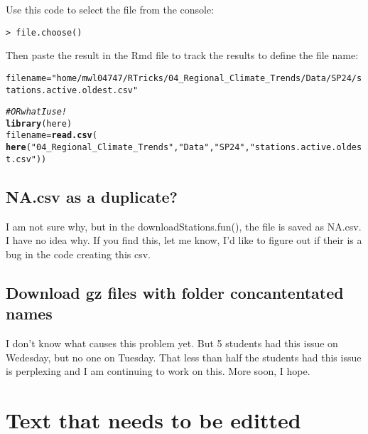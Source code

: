 \documentclass{article}\usepackage[]{graphicx}\usepackage[dvipsnames]{xcolor}
\makeatletter
\newcommand{\hlstr}[1]{\textcolor[rgb]{0.192,0.494,0.8}{#1}}%
\newcommand{\hlcom}[1]{\textcolor[rgb]{0.678,0.584,0.686}{\textit{#1}}}%
\newcommand{\hlstd}[1]{\textcolor[rgb]{0.345,0.345,0.345}{#1}}%
\newcommand{\hlkwb}[1]{\textcolor[rgb]{0.69,0.353,0.396}{#1}}%
\newcommand{\hlkwd}[1]{\textcolor[rgb]{0.737,0.353,0.396}{\textbf{#1}}}%
\newenvironment{kframe}{%
 \def\at@end@of@kframe{}%
 \ifinner\ifhmode%
  \def\at@end@of@kframe{\end{minipage}}%
  \begin{minipage}{\columnwidth}%
 \fi\fi%
 \def\FrameCommand##1{\hskip\@totalleftmargin \hskip-\fboxsep
 \colorbox{shadecolor}{##1}\hskip-\fboxsep
     \hskip-\linewidth \hskip-\@totalleftmargin \hskip\columnwidth}%
 \MakeFramed {\advance\hsize-\width
   \@totalleftmargin\z@ \linewidth\hsize
   \@setminipage}}%
 {\par\unskip\endMakeFramed%
 \at@end@of@kframe}
\newenvironment{knitrout}{}{} %
\makeatother
\begin{document}
Use this code to select the file from the console:

\begin{verbatim}
> file.choose()
\end{verbatim}

Then paste the result in the Rmd file to track the results to define the file name:

\begin{knitrout}
\color{fgcolor}\begin{kframe}
\begin{alltt}
\hlstd{filename} \hlkwb{=} \hlstr{"home/mwl04747/RTricks/04_Regional_Climate_Trends/Data/SP24/stations.active.oldest.csv"}


\hlcom{# OR what I use! }
\hlkwd{library}\hlstd{(here)}
\hlstd{filename} \hlkwb{=} \hlkwd{read.csv}\hlstd{(}
  \hlkwd{here}\hlstd{(}\hlstr{"04_Regional_Climate_Trends"}\hlstd{,} \hlstr{"Data"}\hlstd{,} \hlstr{"SP24"}\hlstd{,} \hlstr{"stations.active.oldest.csv"}\hlstd{))}
\end{alltt}
\end{kframe}
\end{knitrout}

\subsection{NA.csv as a duplicate?}

I am not sure why, but in the downloadStations.fun(), the file is saved as NA.csv. I have no idea why. If you find this, let me know, I'd like to figure out if their is a bug in the code creating this csv.


\subsection{Download gz files with folder concantentated names}

I don't know what causes this problem yet. But 5 students had this issue on Wedesday, but no one on Tuesday. That less than half the students had this issue is perplexing and I am continuing to work on this. More soon, I hope. 

\section{Text that needs to be editted}
\end{document}
